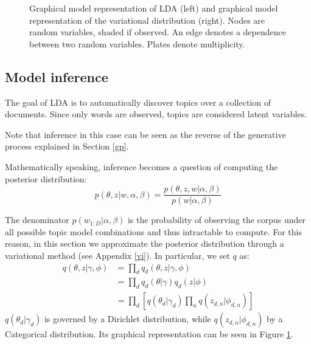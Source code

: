 \begin{figure}[ht]
    \centering
    \caption{Graphical model representation of LDA (left) and graphical model representation of the variational distribution (right). Nodes are random variables, shaded if observed. An edge denotes a dependence between two random variables. Plates denote multiplicity.}
    \label{fig:lda}
\end{figure}

\subsection{Model inference} \label{modelinference}
The goal of LDA is to automatically discover topics over a collection of documents.
Since only words are observed, topics are considered latent variables.

Note that inference in this case can be seen as the reverse of the generative process explained in Section \ref{gp}.

Mathematically speaking, inference becomes a question of computing the posterior distribution:
\[ p(\theta, z | w, \alpha, \beta) = \frac{p(\theta, z, w | \alpha, \beta)}{p(w| \alpha, \beta)} \]

The denominator $p(w_{1:D} | \alpha, \beta)$ is the probability of observing the corpus under all possible topic model combinations
and thus intractable to compute.
For this reason, in this section we approximate the posterior distribution through a variational method
(see Appendix \ref{vi}).
In particular, we set $q$ as:
\begin{equation*}
    \begin{split}
        q(\theta, z | \gamma, \phi) & = \prod_d q_d(\theta, z | \gamma, \phi) \\
        & = \prod_d q_d(\theta | \gamma) q_d(z | \phi) \\
        & = \prod_d [q(\theta_d | \gamma_d) \prod_n q(z_{d,n} | \phi_{d,n})]
    \end{split}
\end{equation*}
$q(\theta_d | \gamma_d)$ is governed by a Dirichlet distribution, while $q(z_{d,n} | \phi_{d,n})$ by a Categorical distribution.
Its graphical representation can be seen in Figure \ref{fig:lda}.

